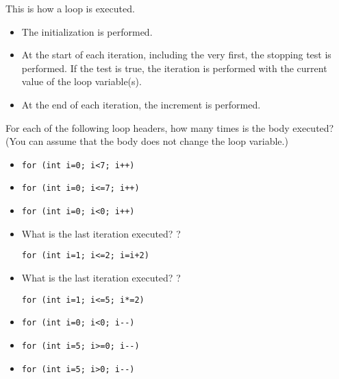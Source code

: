 This is how a loop is executed.
\begin{itemize}
\item The initialization is performed.
\item At the start of each iteration, including the very first, the
  stopping test is performed. If the test is true, the iteration is
  performed with the current value of the loop variable(s).
\item At the end of each iteration, the increment is performed.
\end{itemize}

\begin{review}
  \label{q:loop}
  For each of the following loop headers, how many times is the body
  executed? (You can assume that the body does not change the loop variable.)
  \begin{itemize}
  \item 
\begin{lstlisting}
for (int i=0; i<7; i++)
\end{lstlisting}
  \item 
\begin{lstlisting}
for (int i=0; i<=7; i++)
\end{lstlisting}
  \item 
\begin{lstlisting}
for (int i=0; i<0; i++)
\end{lstlisting}
  \item What is the last iteration executed? ?
\begin{lstlisting}
for (int i=1; i<=2; i=i+2)
\end{lstlisting}
  \item What is the last iteration executed? ?
\begin{lstlisting}
for (int i=1; i<=5; i*=2)
\end{lstlisting}
  \item 
\begin{lstlisting}
for (int i=0; i<0; i--)
\end{lstlisting}
  \item 
\begin{lstlisting}
for (int i=5; i>=0; i--)
\end{lstlisting}
  \item 
\begin{lstlisting}
for (int i=5; i>0; i--)
\end{lstlisting}
  \end{itemize}
\end{review}

